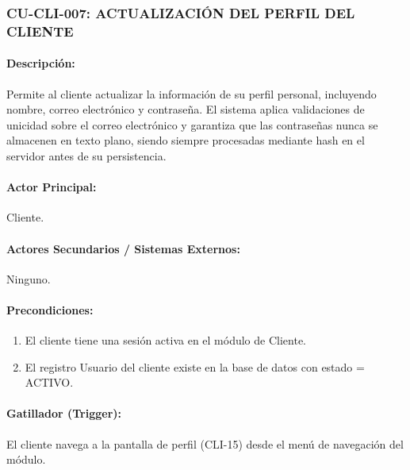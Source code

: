 \subsubsection{CU-CLI-007: ACTUALIZACIÓN DEL PERFIL DEL CLIENTE}
\paragraph{Descripción:} Permite al cliente actualizar la información de su perfil personal, incluyendo nombre, correo electrónico y contraseña. El sistema aplica validaciones de unicidad sobre el correo electrónico y garantiza que las contraseñas nunca se almacenen en texto plano, siendo siempre procesadas mediante hash en el servidor antes de su persistencia.

\paragraph{Actor Principal:} Cliente.

\paragraph{Actores Secundarios / Sistemas Externos:} Ninguno.

\paragraph{Precondiciones:}
\begin{enumerate}
    \item[I.] El cliente tiene una sesión activa en el módulo de Cliente.
    \item[II.] El registro Usuario del cliente existe en la base de datos con estado = ACTIVO.
\end{enumerate}

\paragraph{Gatillador (Trigger):} El cliente navega a la pantalla de perfil (CLI-15) desde el menú de navegación del módulo.

